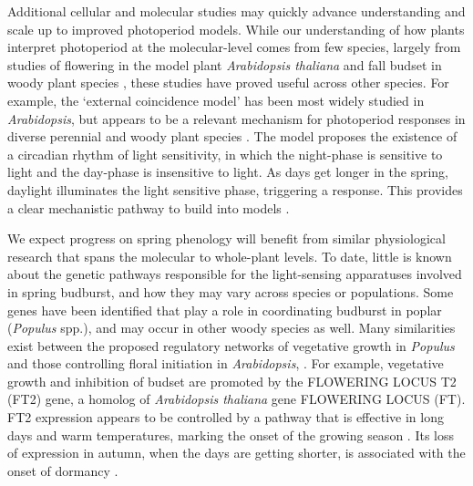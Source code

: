\documentclass{article}
\begin{document}
\par Additional cellular and molecular studies may quickly advance understanding and scale up to improved photoperiod models. While our understanding of how plants interpret photoperiod at the molecular-level comes from few species, largely from studies of flowering in the model plant \emph{Arabidopsis thaliana} \citep[e.g.,][]{suarez2001} and fall budset in woody plant species \citep[e.g.,][]{Howe:1996}, these studies have proved useful across other species. For example, the `external coincidence model' \citep[where plants sense light via blue light receptors and phytochromes, then interpret photoperiod through a coordinated response to light in relation to the time of day, see][]{lagercrantz2009} has been most widely studied in \emph{Arabidopsis}, but appears to be a relevant mechanism for photoperiod responses in diverse perennial and woody plant species \citep{Singh:2017,petterle2013,andres2012,kobayashi2007,davis2002,bastow2002,bunning1936}. The model proposes the existence of a circadian rhythm of light sensitivity, in which the night-phase is sensitive to light and the day-phase is insensitive to light. As days get longer in the spring, daylight illuminates the light sensitive phase, triggering a response. This provides a clear mechanistic pathway to build into models \citep{Burghardt2015}. 

\par We expect progress on spring phenology will benefit from similar physiological research that spans the molecular to whole-plant levels. To date, little is known about the genetic pathways responsible for the light-sensing apparatuses involved in spring budburst, and how they may vary across species or populations. Some genes have been identified that play a role in coordinating budburst in poplar (\emph{Populus} spp.), and may occur in other woody species as well. Many similarities exist between the proposed regulatory networks of vegetative growth in \emph{Populus} and those controlling floral initiation in \emph{Arabidopsis}, \citep{ding2016}. For example, vegetative growth and inhibition of budset are promoted by the FLOWERING LOCUS T2 (FT2) gene, a homolog of \emph{Arabidopsis thaliana} gene FLOWERING LOCUS (FT). FT2 expression appears to be controlled by a pathway that is effective in long days and warm temperatures, marking the onset of the growing season \citep{Hsu:2011}. Its loss of expression in autumn, when the days are getting shorter, is associated with the onset of dormancy \citep{glover2014}.
\end{document}
